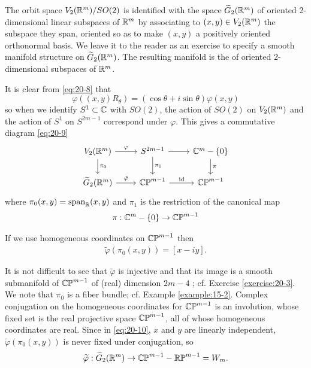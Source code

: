 The orbit space $V_2({\mathbb{R}}^m)/{SO}(2)$ is identified with the space $\widetilde{G}_2({\mathbb{R}}^m)$ 
of oriented 2-dimensional linear subspaces of ${{\mathbb{R}}^m}$ by associating to $( {x,y})  \in  {V}_{2}( {{\mathbb{R}}^m})$ 
the subspace they span, oriented so as to make $(x, y)$ a positively oriented orthonormal basis. We leave it to the 
reader as an exercise to specify a smooth manifold structure on $\widetilde{G}_{2}( {{\mathbb{R}}^m})$. The resulting 
manifold is the  of oriented 2-dimensional subspaces of ${\mathbb{R}}^m$.

It is clear from \eqref{eq:20-8} that
\[
  \varphi ( {( {x,y}) {R}_{\theta }})  
  = ( {\cos \theta  + i\sin \theta }) \varphi ( {x,y})
\]
so when we identify ${S}^{1} \subset  \mathbb{C}$ with ${SO}( 2)$, the action of ${SO}( 2)$ on ${V}_{2}( {{\mathbb{R}}^m})$ 
and the action of ${S}^{1}$ on ${S}^{{2m}- 1}$ correspond under $\varphi$. This gives a commutative diagram \eqref{eq:20-9}
\begin{equation}\label{eq:20-9}
  \begin{tikzcd}
    V_2(\RR^m)\dar{\pi_0}\rar{\varphi} & S^{2m-1}\dar{\pi_1}\rar{} & \CC^m-\{0\}\dar{\pi}\\
    \widetilde{G}_2(\RR^m)\rar{\tilde{\varphi}} & \CP^{m-1}\rar{\text{id}} & \CP^{m-1}
  \end{tikzcd}
\end{equation}
where ${\pi }_{0}( {x,y})  = {\mathrm{span}}_{{\mathbb{R}}}( {x,y})$ and ${\pi }_{1}$ is the restriction of 
the canonical map
\[
  \pi: {\mathbb{C}}^{m}- \{ 0\}  \rightarrow  {\mathbb{CP}}^{m- 1}
\]

If we use homogeneous coordinates on ${\mathbb{CP}}^{m- 1}$ then
\begin{align}\label{eq:20-10}
  \widetilde{\varphi }( {{\pi }_{0}( {x,y}) })  = [  {x- {iy}}].
\end{align}

It is not difficult to see that $\widetilde{\varphi }$ is injective and that its image is a smooth 
submanifold of ${\mathbb{CP}}^{m- 1}$ of (real) dimension ${2m}- 4$ ; cf. Exercise \ref{exercise:20-3}. We note that ${\pi }_{0}$ 
is a fiber bundle; cf. Example \ref{example:15-2}. Complex conjugation on the homogeneous coordinates for ${\mathbb{CP}}^{m-1}$ 
is an involution, whose fixed set is the real projective space ${\mathbb{CP}}^{m- 1}$, all of whose homogeneous 
coordinates are real. Since in \eqref{eq:20-10}, $x$ and $y$ are linearly independent, $\widetilde{\varphi }( {{\pi }_{0}( {x,y}) })$ 
is never fixed under conjugation, so
\begin{align}\label{eq:20-11}
  \widetilde{\varphi } : \widetilde{G}_{2}( {{\mathbb{R}}^m})  \rightarrow  {\mathbb{CP}}^{m- 1}- \mathbb{RP}^{m- 1} = {W}_{m}.
\end{align}

